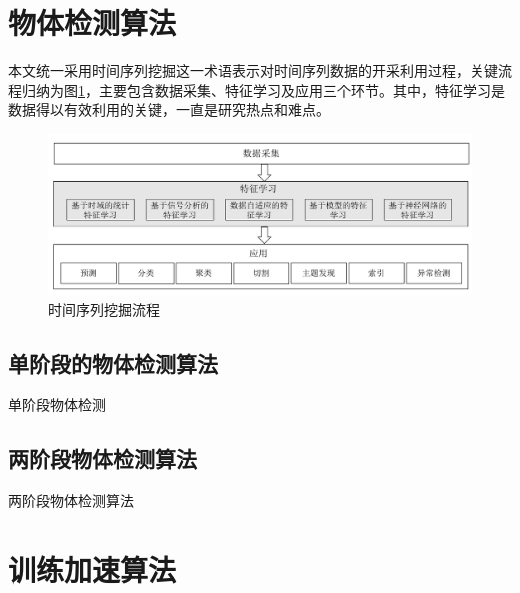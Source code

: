\section{物体检测算法}
\label{sec:ts-representation-review}

本文统一采用{\heiti 时间序列挖掘}这一术语表示对时间序列数据的开采利用过程，关键流程归纳为图\ref{fig:tsm-framework}，主要包含数据采集、特征学习及应用三个环节。其中，特征学习是数据得以有效利用的关键，一直是研究热点和难点\cite{langkvist2014review}。

\begin{figure}[H]
\centering
\includegraphics[scale=0.45]{figures/tsm-framework.png}
\caption{时间序列挖掘流程}
\label{fig:tsm-framework}
\end{figure}

\subsection{单阶段的物体检测算法}

单阶段物体检测

\subsection{两阶段物体检测算法} 

两阶段物体检测算法


\section{训练加速算法}
\label{sec:sr-review}

